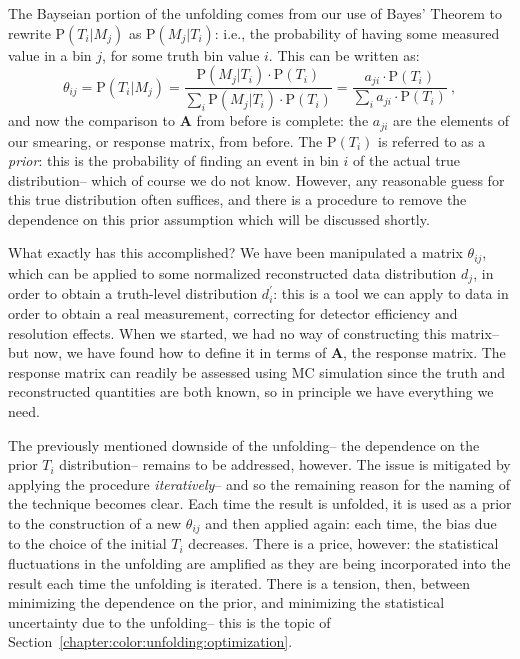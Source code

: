	The Bayseian portion of the unfolding comes from our use of Bayes' Theorem to rewrite $\mathrm{P}(T_i|M_j)$ as $\mathrm{P}(M_j|T_i)$: i.e., the probability of having some measured value in a bin $j$, for some truth bin value $i$. This can be written as:
%
\begin{equation}
  \theta_{ij} = \mathrm{P}(T_i|M_j) = \frac{\mathrm{P}(M_j|T_i)\cdot \mathrm{P}(T_i)}{\sum_i \mathrm{P}(M_j|T_i)\cdot \mathrm{P}(T_i)} = \frac{a_{ji}\cdot \mathrm{P}(T_i)}{\sum_i a_{ji}\cdot \mathrm{P}(T_i)} \ ,
\end{equation}
%
	and now the comparison to $\mathbf{A}$ from before is complete: the $a_{ji}$ are the elements of our smearing, or response matrix, from before. The $\mathrm{P}(T_i)$ is referred to as a \textit{prior}: this is the probability of finding an event in bin $i$ of the actual true distribution-- which of course we do not know. However, any reasonable guess for this true distribution often suffices, and there is a procedure to remove the dependence on this prior assumption which will be discussed shortly.

	What exactly has this accomplished? We have been manipulated a matrix $\theta_{ij}$, which can be applied to some normalized reconstructed data distribution $d_j$, in order to obtain a truth-level distribution $d^\prime_i$: this is a tool we can apply to data in order to obtain a real measurement, correcting for detector efficiency and resolution effects. When we started, we had no way of constructing this matrix-- but now, we have found how to define it in terms of $\mathbf{A}$, the response matrix. The response matrix can readily be assessed using MC simulation since the truth and reconstructed quantities are both known, so in principle we have everything we need.

	The previously mentioned downside of the unfolding-- the dependence on the prior $T_i$ distribution-- remains to be addressed, however. The issue is mitigated by applying the procedure \textit{iteratively}-- and so the remaining reason for the naming of the technique becomes clear. Each time the result is unfolded, it is used as a prior to the construction of a new $\theta_{ij}$ and then applied again: each time, the bias due to the choice of the initial $T_i$ decreases. There is a price, however: the statistical fluctuations in the unfolding are amplified as they are being incorporated into the result each time the unfolding is iterated. There is a tension, then, between minimizing the dependence on the prior, and minimizing the statistical uncertainty due to the unfolding-- this is the topic of Section~\ref{chapter:color:unfolding:optimization}.

